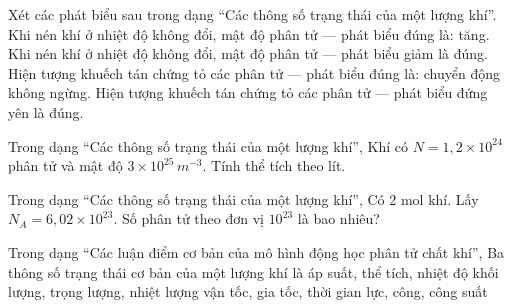 \begin{ex}
Xét các phát biểu sau trong dạng “Các thông số trạng thái của một lượng khí”.
\choiceTF
{\True Khi nén khí ở nhiệt độ không đổi, mật độ phân tử — phát biểu đúng là: tăng.}
{Khi nén khí ở nhiệt độ không đổi, mật độ phân tử — phát biểu giảm là đúng.}
{\True Hiện tượng khuếch tán chứng tỏ các phân tử — phát biểu đúng là: chuyển động không ngừng.}
{Hiện tượng khuếch tán chứng tỏ các phân tử — phát biểu đứng yên là đúng.}
\end{ex}

\begin{ex}
Trong dạng “Các thông số trạng thái của một lượng khí”, Khí có $N=1,2\times10^{24}$ phân tử và mật độ $3\times10^{25}\,m^{-3}$. Tính thể tích theo lít.
\end{ex}

\begin{ex}
Trong dạng “Các thông số trạng thái của một lượng khí”, Có 2 mol khí. Lấy $N_A=6,02\times10^{23}$. Số phân tử theo đơn vị $10^{23}$ là bao nhiêu?
\end{ex}

\begin{ex}
Trong dạng “Các luận điểm cơ bản của mô hình động học phân tử chất khí”, Ba thông số trạng thái cơ bản của một lượng khí là
\choice
{\True áp suất, thể tích, nhiệt độ}
{khối lượng, trọng lượng, nhiệt lượng}
{vận tốc, gia tốc, thời gian}
{lực, công, công suất}
\end{ex}

